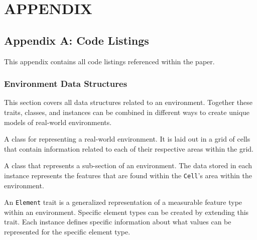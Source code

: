 

\lstset{
  language=Scala,
  basicstyle=\ttfamily,
  numbers=left,
  numberstyle=\footnotesize,
  stepnumber=1,
  numbersep=2.0mm,
  breaklines=true}


\chapter{APPENDIX} \label{appendix}

\section{Appendix A: Code Listings} \label{code_listings}
This appendix contains all code listings referenced within the paper.



\subsection{Environment Data Structures} \label{appendix:environment_data_structures}
This section covers all data structures related to an environment.
Together these traits, classes, and instances can be combined in different ways to create unique models of real-world environments.

\begin{appx}
  \caption{A class for representing a real-world environment. It is laid out in a grid of cells that contain information related to each of their respective areas within the grid.}
   \label{appendix:environment_class}
\end{appx}


\begin{appx}
  \caption{A class that represents a sub-section of an environment. The data stored in each instance represents the features that are found within the \texttt{Cell}'s area within the environment.}
   \label{appendix:cell_class}
\end{appx}


\begin{appx}
  \caption{An \texttt{Element} trait is a generalized representation of a measurable feature type within an environment. Specific element types can be created by extending this trait. Each instance defines specific information about what values can be represented for the specific element type.}
   \label{appendix:elelment_trait}
\end{appx}


